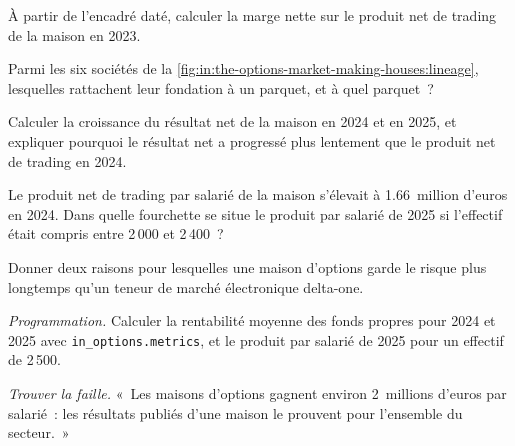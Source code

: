 \begin{exercise}[$\star$]\label{exo:in:the-options-market-making-houses:2}
À partir de l'encadré daté, calculer la marge nette sur le produit net de trading de la maison en 2023.
\end{exercise}

\begin{exercise}[$\star$]\label{exo:in:the-options-market-making-houses:3}
Parmi les six sociétés de la \cref{fig:in:the-options-market-making-houses:lineage}, lesquelles rattachent leur fondation à un parquet, et
à quel parquet~?
\end{exercise}

\begin{exercise}[$\star\star$]\label{exo:in:the-options-market-making-houses:4}
Calculer la croissance du résultat net de la maison en 2024 et en 2025, et expliquer pourquoi le résultat net a progressé plus lentement que le produit
net de trading en 2024.
\end{exercise}

\begin{exercise}[$\star\star$]\label{exo:in:the-options-market-making-houses:5}
Le produit net de trading par salarié de la maison s'élevait à 1.66~million d'euros en 2024. Dans quelle fourchette se situe le produit par salarié de 2025 si
l'effectif était compris entre 2\,000 et 2\,400~?
\end{exercise}

\begin{exercise}[$\star\star$]\label{exo:in:the-options-market-making-houses:6}
Donner deux raisons pour lesquelles une maison d'options garde le risque plus longtemps qu'un teneur de marché électronique delta-one.
\end{exercise}

\begin{exercise}[$\star\star\star$]\label{exo:in:the-options-market-making-houses:7}
\emph{Programmation.} Calculer la rentabilité moyenne des fonds propres pour 2024 et 2025 avec \texttt{in\_options.metrics}, et le produit par salarié de 2025
pour un effectif de 2\,500.
\end{exercise}

\begin{exercise}[$\star\star\star$]\label{exo:in:the-options-market-making-houses:8}
\emph{Trouver la faille.} «~Les maisons d'options gagnent environ 2~millions d'euros par salarié~: les résultats publiés d'une maison le prouvent
pour l'ensemble du secteur.~»
\end{exercise}

